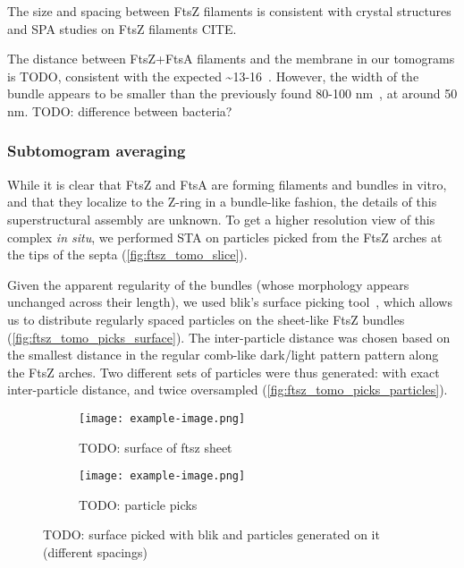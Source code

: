 The size and spacing between FtsZ filaments is consistent with crystal structures and SPA studies on FtsZ filaments CITE.

The distance between FtsZ+FtsA filaments and the membrane in our tomograms is TODO, consistent with the expected \sim13-16~\cite{mcquillenInsightsStructureFunction2020}.
However, the width of the bundle appears to be smaller than the previously found 80-100 nm~\cite{mcquillenInsightsStructureFunction2020}, at around 50 nm.
TODO: difference between bacteria?

\subsubsection{Subtomogram averaging}

While it is clear that FtsZ and FtsA are forming filaments and bundles in vitro, and that they localize to the Z-ring in a bundle-like fashion, the details of this superstructural assembly are unknown.
To get a higher resolution view of this complex \textit{in situ}, we performed STA on particles picked from the FtsZ arches at the tips of the septa (\autoref{fig:ftsz_tomo_slice}).

Given the apparent regularity of the bundles (whose morphology appears unchanged across their length), we used blik's surface picking tool~\cite{gaifasBlikExtensible3D2024,gaifasBlikPythonTool2024}, which allows us to distribute regularly spaced particles on the sheet-like FtsZ bundles (\autoref{fig:ftsz_tomo_picks_surface}).
The inter-particle distance was chosen based on the smallest distance in the regular comb-like dark/light pattern pattern along the FtsZ arches.
Two different sets of particles were thus generated: with exact inter-particle distance, and twice oversampled  (\autoref{fig:ftsz_tomo_picks_particles}).

\begin{figure}[ht]
    \centering
    \begin{subfigure}[B]{.5\textwidth}
        \centering
        \texttt{[image: example-image.png]}
        \caption{TODO: surface of ftsz sheet}
        \label{fig:ftsz_tomo_picks_surface}
    \end{subfigure}%
    \hfill
    \begin{subfigure}[B]{.5\textwidth}
        \centering
        \texttt{[image: example-image.png]}
        \caption{TODO: particle picks}
        \label{fig:ftsz_tomo_picks_particles}
    \end{subfigure}%
    \caption{TODO: surface picked with blik and particles generated on it (different spacings)}
    \label{fig:ftsz_tomo_picks}
\end{figure}

